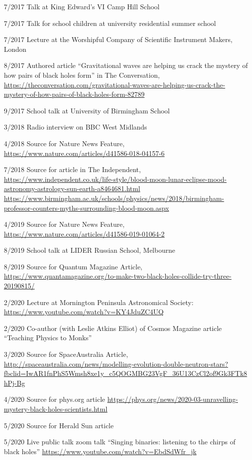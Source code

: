 \documentclass[margin,line]{res}
\begin{document}
\begin{resume}
7/2017	Talk at King Edward's VI Camp Hill School

7/2017	Talk for school children at university residential summer school

7/2017 	Lecture at the Worshipful Company of Scientific Instrument Makers, London

8/2017	Authored article ``Gravitational waves are helping us crack the mystery of how pairs of black holes form'' in The Conversation,\\ 
\url{https://theconversation.com/gravitational-waves-are-helping-us-crack-the-mystery-of-how-pairs-of-black-holes-form-82789}

9/2017	School talk at University of Birmingham School

3/2018	Radio interview on BBC West Midlands

4/2018	Source for Nature News Feature, \url{https://www.nature.com/articles/d41586-018-04157-6}

7/2018 	Source for article in The Independent, \url{https://www.independent.co.uk/life-style/blood-moon-lunar-eclipse-mood-astronomy-astrology-sun-earth-a8464681.html}\\
\url{https://www.birmingham.ac.uk/schools/physics/news/2018/birmingham-professor-counters-myths-surrounding-blood-moon.aspx}

4/2019	Source for Nature News Feature, \url{https://www.nature.com/articles/d41586-019-01064-2}

8/2019	School talk at LIDER Russian School, Melbourne

8/2019 	Source for Quantum Magazine Article, \url{https://www.quantamagazine.org/to-make-two-black-holes-collide-try-three-20190815/}

2/2020	Lecture at Mornington Peninsula Astronomical Society: \url{https://www.youtube.com/watch?v=KY4JduZC4UQ}

2/2020	Co-author (with Leslie Atkins Elliot) of Cosmos Magazine article ``Teaching Physics to Monks''
	
3/2020 	Source for SpaceAustralia Article, \url{http://spaceaustralia.com/news/modelling-evolution-double-neutron-stars?fbclid=IwAR1fnPhS5Wmsh8xe1y_c5QOGMBG23VgF_36U13CzCl2of9Gk3FTk8hPj-Bg}
	  
4/2020	Source for phys.org article \url{https://phys.org/news/2020-03-unravelling-mystery-black-holes-scientists.html}

5/2020	Source for Herald Sun article

5/2020	Live public talk zoom talk ``Singing binaries: listening to the chirps of black holes'' \url{https://www.youtube.com/watch?v=EbdSdWfr_jk}


\end{resume}
\end{document}
